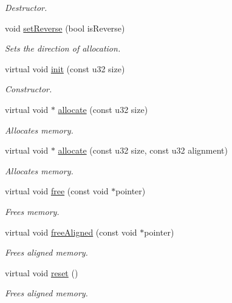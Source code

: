 \begin{DoxyCompactItemize}
\begin{DoxyCompactList}\small\item\em Destructor. \end{DoxyCompactList}\item 
void \hyperlink{classDE_1_1LinearAllocator_aee64419a4f3c40ac5163ebb744a55155}{set\+Reverse} (bool is\+Reverse)
\begin{DoxyCompactList}\small\item\em Sets the direction of allocation. \end{DoxyCompactList}\item 
virtual void \hyperlink{classDE_1_1LinearAllocator_afc065d6a36571958cb33648894fb6c57}{init} (const u32 size)
\begin{DoxyCompactList}\small\item\em Constructor. \end{DoxyCompactList}\item 
virtual void $\ast$ \hyperlink{classDE_1_1LinearAllocator_a6d037588499a66590b52335c8b221454}{allocate} (const u32 size)
\begin{DoxyCompactList}\small\item\em Allocates memory. \end{DoxyCompactList}\item 
virtual void $\ast$ \hyperlink{classDE_1_1LinearAllocator_a5d6bf7e2dfe65f6795e77b3a2ed9e811}{allocate} (const u32 size, const u32 alignment)
\begin{DoxyCompactList}\small\item\em Allocates memory. \end{DoxyCompactList}\item 
virtual void \hyperlink{classDE_1_1LinearAllocator_ae1913dde9c2b91738d42686fb08cc755}{free} (const void $\ast$pointer)
\begin{DoxyCompactList}\small\item\em Frees memory. \end{DoxyCompactList}\item 
virtual void \hyperlink{classDE_1_1LinearAllocator_a4199d84edd3d515e0db8512efdf1f208}{free\+Aligned} (const void $\ast$pointer)
\begin{DoxyCompactList}\small\item\em Frees aligned memory. \end{DoxyCompactList}\item 
virtual void \hyperlink{classDE_1_1LinearAllocator_a0dbec6e2529dc2f13757c104b17bbdda}{reset} ()\hypertarget{classDE_1_1LinearAllocator_a0dbec6e2529dc2f13757c104b17bbdda}{}\label{classDE_1_1LinearAllocator_a0dbec6e2529dc2f13757c104b17bbdda}

\begin{DoxyCompactList}\small\item\em Frees aligned memory. \end{DoxyCompactList}\end{DoxyCompactItemize}
